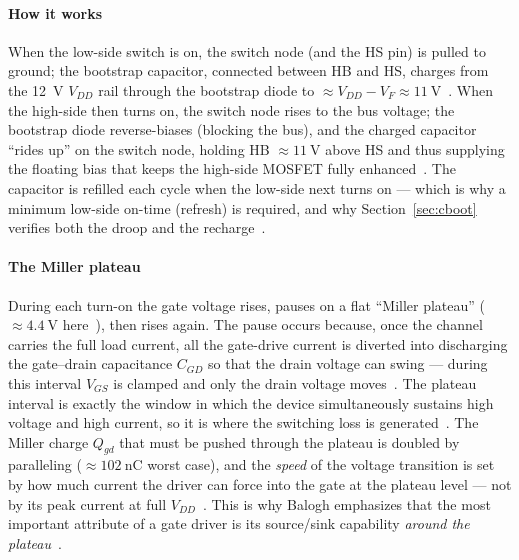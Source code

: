 \documentclass[journal,onecolumn,11pt]{IEEEtran}
\begin{document}
\paragraph{How it works}
When the low-side switch is on, the switch node (and the HS pin) is pulled to ground; the bootstrap
capacitor, connected between HB and HS, charges from the \SI{12}{\volt} $V_{DD}$ rail through the
bootstrap diode to $\approx V_{DD}-V_F\approx\SI{11}{\volt}$~\cite{ucc27211,ir_an978}. When the
high-side then turns on, the switch node rises to the bus voltage; the bootstrap diode reverse-biases
(blocking the bus), and the charged capacitor ``rides up'' on the switch node, holding HB
$\approx\SI{11}{\volt}$ above HS and thus supplying the floating bias that keeps the high-side MOSFET
fully enhanced~\cite{ucc27211,ir_an978}. The capacitor is refilled each cycle when the low-side next
turns on --- which is why a minimum low-side on-time (refresh) is required, and why
Section~\ref{sec:cboot} verifies both the droop and the recharge~\cite{ir_an978,ir_an1123}.

\paragraph{The Miller plateau}
During each turn-on the gate voltage rises, pauses on a flat ``Miller plateau''
($\approx\SI{4.4}{\volt}$ here~\cite{ipt015ds}), then rises again. The pause occurs because, once
the channel carries the full load current, all the gate-drive current is diverted into discharging
the gate--drain capacitance $C_{GD}$ so that the drain voltage can swing --- during this interval
$V_{GS}$ is clamped and only the drain voltage moves~\cite{balogh}. The plateau interval is exactly
the window in which the device simultaneously sustains high voltage and high current, so it is where
the switching loss is generated~\cite{balogh}. The Miller charge $Q_{gd}$ that must be pushed through
the plateau is doubled by paralleling ($\approx\SI{102}{\nano\coulomb}$ worst case), and the
\emph{speed} of the voltage transition is set by how much current the driver can force into the gate
at the plateau level --- not by its peak current at full $V_{DD}$~\cite{balogh}. This is why
Balogh emphasizes that the most important attribute of a gate driver is its source/sink capability
\emph{around the plateau}~\cite{balogh}.
\end{document}
